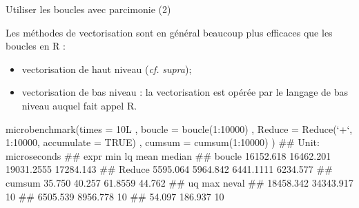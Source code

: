 \documentclass[12pt,handout,ignorenonframetext,]{beamer}
\newenvironment{Shaded}{}{}
\newcommand{\KeywordTok}[1]{\textcolor[rgb]{0.00,0.00,1.00}{{#1}}}
\newcommand{\DataTypeTok}[1]{{#1}}
\newcommand{\DecValTok}[1]{{#1}}
\newcommand{\StringTok}[1]{\textcolor[rgb]{0.00,0.50,0.50}{{#1}}}
\newcommand{\OtherTok}[1]{\textcolor[rgb]{1.00,0.25,0.00}{{#1}}}
\newcommand{\NormalTok}[1]{{#1}}
\providecommand{\tightlist}{%
\setlength{\itemsep}{0pt}\setlength{\parskip}{0pt}}
\renewenvironment{Shaded}{\begin{snugshade}}{\end{snugshade}}
\begin{document}
\begin{frame}[fragile]{Utiliser les boucles avec parcimonie (2)}

\small
Les méthodes de vectorisation sont en général beaucoup plus efficaces
que les boucles en R :

\begin{itemize}
\tightlist
\item
  vectorisation de haut niveau (\emph{cf.} \emph{supra});
\item
  vectorisation de bas niveau : la vectorisation est opérée par le
  langage de bas niveau auquel fait appel R.
\end{itemize}

\pause \footnotesize

\begin{Shaded}
\begin{Highlighting}[]
\KeywordTok{microbenchmark}\NormalTok{(}\DataTypeTok{times =} \NormalTok{10L}
  \NormalTok{, }\DataTypeTok{boucle =} \KeywordTok{boucle}\NormalTok{(}\DecValTok{1}\NormalTok{:}\DecValTok{10000}\NormalTok{)}
  \NormalTok{, }\DataTypeTok{Reduce =} \KeywordTok{Reduce}\NormalTok{(}\StringTok{`}\DataTypeTok{+}\StringTok{`}\NormalTok{, }\DecValTok{1}\NormalTok{:}\DecValTok{10000}\NormalTok{, }\DataTypeTok{accumulate =} \OtherTok{TRUE}\NormalTok{)}
  \NormalTok{, }\DataTypeTok{cumsum =} \KeywordTok{cumsum}\NormalTok{(}\DecValTok{1}\NormalTok{:}\DecValTok{10000}\NormalTok{)}
\NormalTok{)}
  \NormalTok{## Unit: microseconds}
  \NormalTok{##    expr       min        lq       mean    median}
  \NormalTok{##  boucle 16152.618 16462.201 19031.2555 17284.143}
  \NormalTok{##  Reduce  5595.064  5964.842  6441.1111  6234.577}
  \NormalTok{##  cumsum    35.750    40.257    61.8559    44.762}
  \NormalTok{##         uq       max neval}
  \NormalTok{##  18458.342 34343.917    10}
  \NormalTok{##   6505.539  8956.778    10}
  \NormalTok{##     54.097   186.937    10}
\end{Highlighting}
\end{Shaded}

\end{frame}
\end{document}
